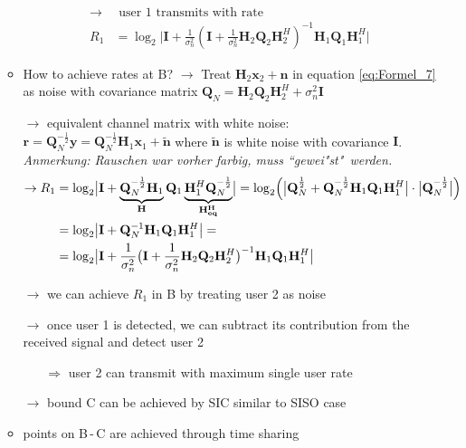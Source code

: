 \documentclass[a4paper, 10pt]{article}
\begin{document}
\begin{itemize}
\begin{itemize}
\begin{align*}
		\rightarrow &\text{ user 1 transmits with rate}\\
		R_1 &= \log_2\bigl|\mathbf{I} + \frac{1}{\sigma_n^2}(\mathbf{I} + \frac{1}{\sigma_n^2}\mathbf{H}_2\mathbf{Q}_2\mathbf{H}_2^H)^{-1}\mathbf{H}_1\mathbf{Q}_1\mathbf{H}_1^H\bigr|
	\end{align*}
	\item How to achieve rates at B? $\rightarrow $ Treat $\mathbf{H}_2\mathbf{x}_2 + \mathbf{n} $ in equation  \ref{eq:Formel_7} as noise with covariance matrix $ \mathbf{Q}_N = \mathbf{H}_2\mathbf{Q}_2\mathbf{H}_2^H + \sigma_n^2\mathbf{I} $
	\item[$\rightarrow$] equivalent channel matrix with white noise: $\mathbf{r} = \mathbf{Q}_N^{-\frac{1}{2}}\mathbf{y} = 	\mathbf{Q}_N^{-\frac{1}{2}}\mathbf{H}_1\mathbf{x}_1 + \tilde{\mathbf{n}} $ where $ \tilde{\mathbf{n}} $ is white noise with covariance $\mathbf{I}$. \\ \textit{Anmerkung: Rauschen war vorher farbig, muss ``gewei"st"\  werden.} 
	\begin{align*}
		\rightarrow R_1 &= \log_2\bigl|\mathbf{I} + \underbrace{\mathbf{Q}_N^{-\frac{1}{2}} \mathbf{H}_1}_{\mathbf{H}}\mathbf{Q}_1\underbrace{\mathbf{H}_1^H\mathbf{Q}_N^{-\frac{1}{2}}}_{\mathbf{H_{eq}^H}}\bigr|  = \log_2\Bigl(\bigl|\mathbf{Q}_N^{\frac{1}{2}} + \mathbf{Q}_N^{-\frac{1}{2}}\mathbf{H}_1\mathbf{Q}_1\mathbf{H}_1^H\bigr|\cdot\bigl|\mathbf{Q}_N^{-\frac{1}{2}}\bigr|\Bigr)\\
		&= \log_2\bigl|\mathbf{I} + \mathbf{Q}_N^{-1}\mathbf{H}_1\mathbf{Q}_1\mathbf{H}_1^H\bigr| = \\
		&= \log_2\bigl|\mathbf{I} + \frac{1}{\sigma_n^2}\bigl(\mathbf{I} + \frac{1}{\sigma_n^2}\mathbf{H}_2\mathbf{Q}_2\mathbf{H}_2^H\bigr)^{-1}\mathbf{H}_1\mathbf{Q}_1\mathbf{H}_1^H\bigr|
	\end{align*}
	\item[$\rightarrow$] we can achieve $R_1 $ in B by treating user 2 as noise
	\item[$\rightarrow$] once user 1 is detected, we can subtract its contribution from the received signal and detect user 2
	\begin{itemize}
		\item[$\Rightarrow$] user 2 can transmit with maximum single user rate
	\end{itemize}
	\item[$\rightarrow$] bound C can be achieved by SIC similar to SISO case
	\item points on B\,-\,C are achieved through time sharing
	\end{itemize}

\end{itemize}
\end{document}
